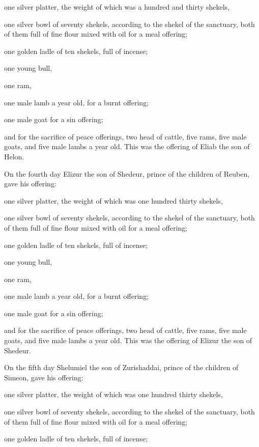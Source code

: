 one silver platter, the weight of which was a hundred and thirty
shekels,

one silver bowl of seventy shekels, according to the shekel of the
sanctuary, both of them full of fine flour mixed with oil for a meal
offering;

 one golden ladle of ten shekels, full of incense;

 one young bull,

one ram,

one male lamb a year old, for a burnt offering;

 one male goat for a sin offering;

 and for the sacrifice of peace offerings, two head of
cattle, five rams, five male goats, and five male lambs a year old. This
was the offering of Eliab the son of Helon.

 On the fourth day Elizur the son of Shedeur, prince of the
children of Reuben,  gave his offering:

one silver platter, the weight of which was one hundred thirty shekels,

one silver bowl of seventy shekels, according to the shekel of the
sanctuary, both of them full of fine flour mixed with oil for a meal
offering;

 one golden ladle of ten shekels, full of incense;

 one young bull,

one ram,

one male lamb a year old, for a burnt offering;

 one male goat for a sin offering;

 and for the sacrifice of peace offerings, two head of
cattle, five rams, five male goats, and five male lambs a year old. This
was the offering of Elizur the son of Shedeur.

 On the fifth day Shelumiel the son of Zurishaddai, prince
of the children of Simeon,  gave his offering:

one silver platter, the weight of which was one hundred thirty shekels,

one silver bowl of seventy shekels, according to the shekel of the
sanctuary, both of them full of fine flour mixed with oil for a meal
offering;

 one golden ladle of ten shekels, full of incense;

